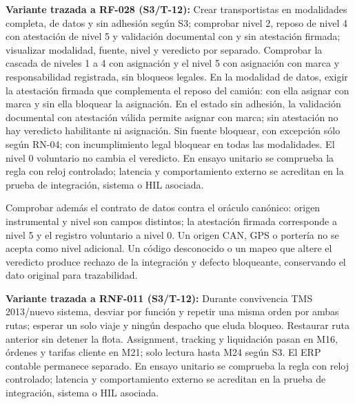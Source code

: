 \par\noindent\textbf{Variante trazada a RF-028 (S3/T-12):} Crear transportistas en modalidades completa, de datos y sin adhesión según S3; comprobar nivel 2, reposo de nivel 4 con atestación de nivel 5 y validación documental con y sin atestación firmada; visualizar modalidad, fuente, nivel y veredicto por separado. Comprobar la cascada de niveles 1 a 4 con asignación y el nivel 5 con asignación con marca y responsabilidad registrada, sin bloqueos legales. En la modalidad de datos, exigir la atestación firmada que complementa el reposo del camión: con ella asignar con marca y sin ella bloquear la asignación. En el estado sin adhesión, la validación documental con atestación válida permite asignar con marca; sin atestación no hay veredicto habilitante ni asignación. Sin fuente bloquear, con excepción sólo según RN-04; con incumplimiento legal bloquear en todas las modalidades. El nivel 0 voluntario no cambia el veredicto. En ensayo unitario se comprueba la regla con reloj controlado; latencia y comportamiento externo se acreditan en la prueba de integración, sistema o HIL asociada.\par

\par\noindent Comprobar además el contrato de datos contra el oráculo canónico: origen instrumental y nivel son campos distintos; la atestación firmada corresponde a nivel 5 y el registro voluntario a nivel 0. Un origen CAN, GPS o portería no se acepta como nivel adicional. Un código desconocido o un mapeo que altere el veredicto produce rechazo de la integración y defecto bloqueante, conservando el dato original para trazabilidad.\par

\par\noindent\textbf{Variante trazada a RNF-011 (S3/T-12):} Durante convivencia TMS 2013/nuevo sistema, desviar por función y repetir una misma orden por ambas rutas; esperar un solo viaje y ningún despacho que eluda bloqueo. Restaurar ruta anterior sin detener la flota. Assignment, tracking y liquidación pasan en M16, órdenes y tarifas cliente en M21; solo lectura hasta M24 según S3. El ERP contable permanece separado. En ensayo unitario se comprueba la regla con reloj controlado; latencia y comportamiento externo se acreditan en la prueba de integración, sistema o HIL asociada.\par




